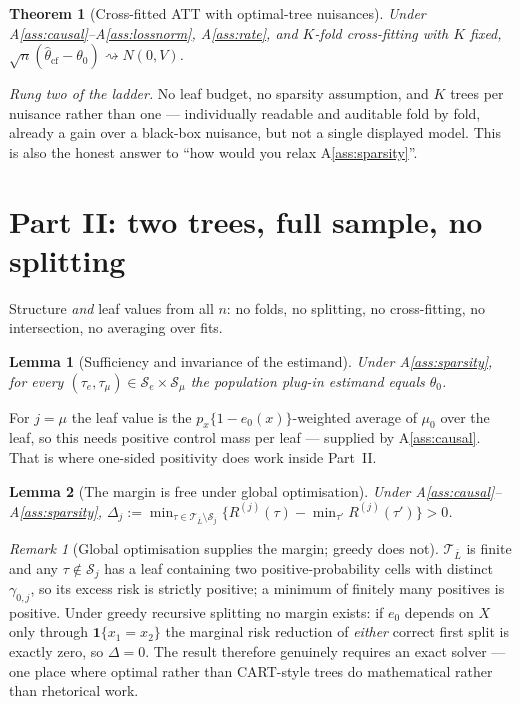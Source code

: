 \documentclass[11pt]{article}
\theoremstyle{plain}
\newtheorem{theorem}{Theorem}
\newtheorem{lemma}{Lemma}
\theoremstyle{definition}
\theoremstyle{remark}
\newtheorem{remark}{Remark}
\newcommand{\cT}{\mathcal{T}}
\newcommand{\cS}{\mathcal{S}}
\newcommand{\ez}{e_0}
\newcommand{\mz}{\mu_0}
\newcommand{\thetahat}{\widehat{\theta}}
\begin{document}
\begin{theorem}[Cross-fitted ATT with optimal-tree nuisances]\label{thm:crossfit}
Under A\ref{ass:causal}--A\ref{ass:lossnorm}, A\ref{ass:rate}, and $K$-fold
cross-fitting with $K$ fixed,
$\sqrt n(\thetahat_{\mathrm{cf}}-\theta_0)\rightsquigarrow N(0,V)$.
\end{theorem}

\noindent \emph{Rung two of the ladder.} No leaf budget, no sparsity assumption,
and $K$ trees per nuisance rather than one --- individually readable and auditable
fold by fold, already a gain over a black-box nuisance, but not a single displayed
model. This is also the honest answer to ``how would you relax
A\ref{ass:sparsity}''.

\section{Part II: two trees, full sample, no splitting}

Structure \emph{and} leaf values from all $n$: no folds, no splitting, no
cross-fitting, no intersection, no averaging over fits.

\begin{lemma}[Sufficiency and invariance of the estimand]\label{lem:invariance}
Under A\ref{ass:sparsity}, for every $(\tau_e,\tau_\mu)\in\cS_e\times\cS_\mu$ the
population plug-in estimand equals $\theta_0$.
\end{lemma}

\noindent For $j=\mu$ the leaf value is the $p_x\{1-\ez(x)\}$-weighted average of
$\mz$ over the leaf, so this needs positive control mass per leaf --- supplied by
A\ref{ass:causal}. That is where one-sided positivity does work inside Part~II.

\begin{lemma}[The margin is free under global optimisation]\label{lem:margin}
Under A\ref{ass:causal}--A\ref{ass:sparsity},
$\Delta_j:=\min_{\tau\in\cT_{\bar L}\setminus\cS_j}
\{R^{(j)}(\tau)-\min_{\tau'}R^{(j)}(\tau')\}>0$.
\end{lemma}

\begin{remark}[Global optimisation supplies the margin; greedy does not]
\label{rem:greedy}
$\cT_{\bar L}$ is finite and any $\tau\notin\cS_j$ has a leaf containing two
positive-probability cells with distinct $\gamma_{0,j}$, so its excess risk is
strictly positive; a minimum of finitely many positives is positive. Under greedy
recursive splitting no margin exists: if $\ez$ depends on $X$ only through
$\mathbf1\{x_1=x_2\}$ the marginal risk reduction of \emph{either} correct first
split is exactly zero, so $\Delta=0$. The result therefore genuinely requires an
exact solver --- one place where optimal rather than CART-style trees do
mathematical rather than rhetorical work.
\end{remark}
\end{document}
